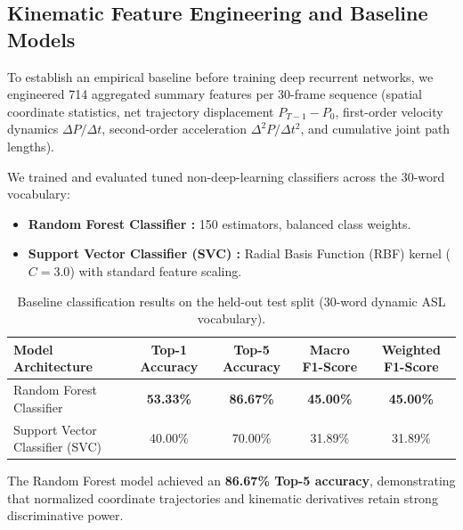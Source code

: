 \documentclass{article}
\begin{document}
\subsection*{Kinematic Feature Engineering and Baseline Models}
To establish an empirical baseline before training deep recurrent networks, we engineered 714 aggregated summary features per 30-frame sequence (spatial coordinate statistics, net trajectory displacement $P_{T-1} - P_0$, first-order velocity dynamics $\Delta P / \Delta t$, second-order acceleration $\Delta^2 P / \Delta t^2$, and cumulative joint path lengths).

We trained and evaluated tuned non-deep-learning classifiers across the 30-word vocabulary:
\begin{itemize}
    \item \textbf{Random Forest Classifier \cite{breiman2001random}:} 150 estimators, balanced class weights.
    \item \textbf{Support Vector Classifier (SVC) \cite{cortes1995support}:} Radial Basis Function (RBF) kernel ($C = 3.0$) with standard feature scaling.
\end{itemize}

\begin{table}[h]
\centering
\begin{tabular}{lcccc}
\toprule
\textbf{Model Architecture} & \textbf{Top-1 Accuracy} & \textbf{Top-5 Accuracy} & \textbf{Macro F1-Score} & \textbf{Weighted F1-Score} \\
\midrule
Random Forest Classifier & \textbf{53.33\%} & \textbf{86.67\%} & \textbf{45.00\%} & \textbf{45.00\%} \\
Support Vector Classifier (SVC) & 40.00\% & 70.00\% & 31.89\% & 31.89\% \\
\bottomrule
\end{tabular}
\caption{Baseline classification results on the held-out test split (30-word dynamic ASL vocabulary).}
\end{table}

The Random Forest model achieved an \textbf{86.67\% Top-5 accuracy}, demonstrating that normalized coordinate trajectories and kinematic derivatives retain strong discriminative power.
\end{document}
